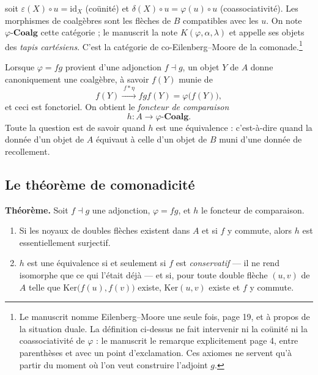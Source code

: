 \documentclass[11pt,a4paper]{article}
\begin{document}
soit $\varepsilon(X) \circ u = \mathrm{id}_{X}$ (coünité) et
$\delta(X) \circ u = \varphi(u) \circ u$ (coassociativité). Les morphismes de
coalgèbres sont les flèches de $B$ compatibles avec les $u$. On note
$\varphi\text{-}\mathbf{Coalg}$ cette catégorie ; le manuscrit la note
$K(\varphi, \alpha, \lambda)$ et appelle ses objets des \emph{tapis
cartésiens}. C'est la catégorie de co-Eilenberg--Moore de la
comonade.\footnote{Le manuscrit nomme Eilenberg--Moore une seule fois, page 19,
et à propos de la situation duale. La définition ci-dessus ne fait intervenir
ni la coünité ni la coassociativité de $\varphi$ : le manuscrit le remarque
explicitement page 4, entre parenthèses et avec un point d'exclamation. Ces
axiomes ne servent qu'à partir du moment où l'on veut construire l'adjoint $g$.}

Lorsque $\varphi = fg$ provient d'une adjonction $f \dashv g$, un objet $Y$ de
$A$ donne canoniquement une coalgèbre, à savoir $f(Y)$ munie de
\[
  f(Y) \xrightarrow{\;f * \eta\;} fgf(Y) = \varphi\bigl( f(Y) \bigr) ,
\]
et ceci est fonctoriel. On obtient le \emph{foncteur de comparaison}
\[
  h : A \longrightarrow \varphi\text{-}\mathbf{Coalg} .
\]
Toute la question est de savoir quand $h$ est une équivalence : c'est-à-dire
quand la donnée d'un objet de $A$ équivaut à celle d'un objet de $B$ muni d'une
donnée de recollement.

\subsection*{Le théorème de comonadicité}

\textbf{Théorème.} Soit $f \dashv g$ une adjonction, $\varphi = fg$, et $h$ le
foncteur de comparaison.

\begin{enumerate}
\item[a)] Si les noyaux de doubles flèches existent dans $A$ et si $f$ y
commute, alors $h$ est essentiellement surjectif.
\item[b)] $h$ est une équivalence si et seulement si $f$ est
\emph{conservatif} — il ne rend isomorphe que ce qui l'était déjà — et si, pour
toute double flèche $(u,v)$ de $A$ telle que $\mathrm{Ker}\bigl(f(u),
f(v)\bigr)$ existe, $\mathrm{Ker}(u,v)$ existe et $f$ y commute.
\end{enumerate}
\end{document}
